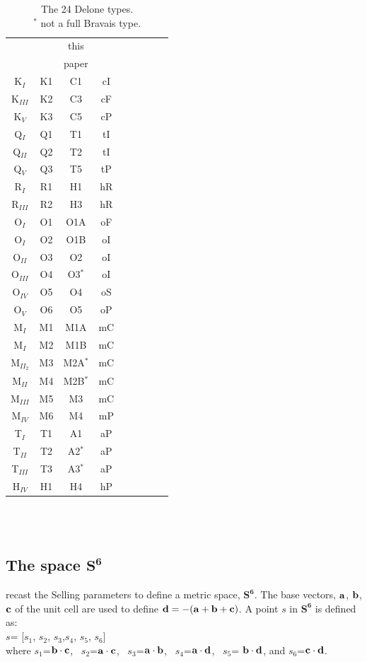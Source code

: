 \documentclass[preprint]{iucr}              %
\newcommand{\SVI}[0]{$\mathbf{S^{6}}$}
\newcommand{\scalarsub}[2]{$#1_#2$}
\newcommand{\vdotv}[2]{${{\bf #1 \cdot #2}}$}
\begin{document}
	
	\begin{table}
		\begin{tabular}{ccccccccc}
			\toprule
			\cite{Delaunay1932} & \cite{Burzlaff1985}   &this  \\
			&  & paper \\
			\midrule
			K$_I$ & K1 & C1 & cI \\		
			K$_{III}$ & K2 & C3 &cF \\		
			K$_V$ & K3 & C5 &cP \\		
			Q$_I$ & Q1 & T1 &tI \\		
			Q$_{II}$ & Q2 & T2 &tI \\		
			Q$_V$ & Q3 & T5 & tP\\		
			R$_I$ & R1 & H1 & hR \\		
			R$_{III}$ & R2 & H3 & hR \\		
			O$_I$ & O1 & O1A & oF  \\		
			O$_I$ & O2 & O1B &oI  \\		
			O$_{II}$ & O3 & O2 & oI   \\		
			O$_{III}$ & O4 & O3$^*$ & oI   \\		
			O$_{IV}$ & O5 & O4 & oS   \\		
			O$_V$ & O6 & O5 & oP   \\		
			M$_I$ & M1 & M1A & mC  \\		
			M$_I$ & M2 & M1B & mC \\		
			M$_{II_2}$  & M3 & M2A$^*$ & mC \\		
			M$_{II}$ & M4 & M2B$^*$ & mC  \\		
			M$_{III}$ & M5 & M3 & mC  \\		
			M$_{IV}$ & M6 & M4 & mP  \\		
			T$_I$ & T1 & A1 & aP  \\ 		
			T$_{II}$ & T2 & A2$^*$ & aP \\		
			T$_{III}$ & T3 & A3$^*$ & aP \\		
			H$_{IV}$  & H1 & H4 & hP \\ 
			\bottomrule
		\end{tabular}
		~\\ ~\\
		\caption{The 24 Delone types. \cite{Delaunay1932}\\
			$^*$ not a full Bravais type.}
		\label{table:DeloneTypeConcordance}
	\end{table}
	
	\subsection{The space \SVI{}}
	\cite{andrews2019} recast the Selling parameters to define a metric space, \SVI{}.
	The base vectors, $\bf{a}$, $\bf{b}$, $\bf{c}$ of the unit cell
	are used to define $\bf{d}=-(\bf{a}+\bf{b}+\bf{c})$.
	A point ${s}$ in \SVI{} is defined as:\\
	${s}$= [\scalarsub{s}{1}, \scalarsub{s}{2}, \scalarsub{s}{3},\scalarsub{s}{4}, \scalarsub{s}{5}, \scalarsub{s}{6}] \\
	where \scalarsub{s}{1}=\vdotv{b}{c}, ~\scalarsub{s}{2}=\vdotv{a}{c}, ~\scalarsub{s}{3}=\vdotv{a}{b}, 
	~\scalarsub{s}{4}=\vdotv{a}{d}, ~\scalarsub{s}{5}= \vdotv{b}{d}, and \scalarsub{s}{6}=\vdotv{c}{d}.
	
\end{document}
